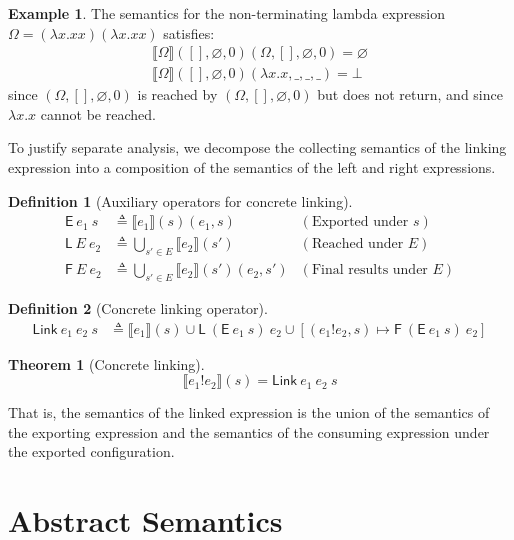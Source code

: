 \documentclass[acmsmall,screen,review]{acmart}
\theoremstyle{definition}
\newtheorem{definition}{Definition}[section]
\newtheorem{thm}{Theorem}[section]
\newtheorem{example}{Example}[section]
\newcommand*{\link}[2]{{#1}\mathtt{!}{#2}}
\newcommand*{\EE}{\mathsf{E}}
\newcommand*{\LL}{\mathsf{L}}
\newcommand*{\Link}{\mathsf{Link}}
\newcommand*{\sembracket}[1]{\lBrack{#1}\rBrack}
\begin{document}
\begin{example}
  The semantics for the non-terminating lambda expression $\Omega=(\lambda x.xx)(\lambda x.xx)$ satisfies:
  \begin{align*}
    \sembracket{\Omega}([],\varnothing,0)(\Omega,[],\varnothing,0)=\varnothing \\
    \sembracket{\Omega}([],\varnothing,0)(\lambda x.x,\_,\_,\_)=\bot
  \end{align*}
  since $(\Omega,[],\varnothing,0)$ is reached by $(\Omega,[],\varnothing,0)$ but does not return, and since $\lambda x.x$ cannot be reached.
\end{example}

To justify separate analysis, we decompose the collecting semantics of the linking expression into a composition of the semantics of the left and right expressions.

\begin{definition}[Auxiliary operators for concrete linking]
  \begin{align*}
    \EE\:e_1\:s        & \triangleq\sembracket{e_1}(s)(e_1,s)                    & (\text{Exported under }s)      \\
    \LL\:E\:e_2        & \triangleq\bigcup_{s'\in E}\sembracket{e_2}(s')         & (\text{Reached under }E)       \\
    \mathsf{F}\:E\:e_2 & \triangleq\bigcup_{s'\in E}\sembracket{e_2}(s')(e_2,s') & (\text{Final results under }E)
  \end{align*}
\end{definition}

\begin{definition}[Concrete linking operator]
  \begin{align*}
    \Link\:e_1\:e_2\:s & \triangleq\sembracket{e_1}(s)\cup\LL\:(\EE\:e_1\:s)\:e_2\cup[(\link{e_1}{e_2},s)\mapsto\mathsf{F}\:(\EE\:e_1\:s)\:e_2]
  \end{align*}
\end{definition}

\begin{thm}[Concrete linking]
  \[
    \sembracket{\link{e_1}{e_2}}(s)=\Link\:e_1\:e_2\:s
  \]

  That is, the semantics of the linked expression is the union of the semantics of the exporting expression and the semantics of the consuming expression under the exported configuration.
\end{thm}

\section{Abstract Semantics}
\end{document}
